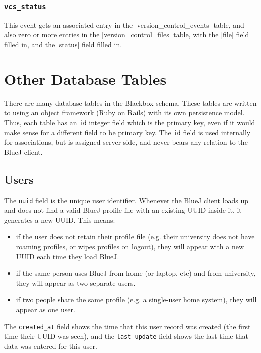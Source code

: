 \documentclass{book}
\begin{document}
\subsection{\lstinline|vcs_status|}

This event gets an associated entry in the |version_control_events|
table, and also zero or more entries in the |version_control_files|
table, with the |file| field filled in, and the |status| field filled
in.

\chapter{Other Database Tables}

There are many database tables in the Blackbox schema.  These tables are
written to using an object framework (Ruby on Rails) with its own persistence
model.  Thus, each table has an \verb$id$ integer field which is the primary
key, even if it would make sense for a different field to be primary key.  The
\texttt{id} field is used internally for associations, but is assigned
server-side, and never bears any relation to the BlueJ client.

\section{Users}


The \texttt{uuid} field is the unique user identifier.  Whenever the BlueJ
client loads up and does not find a valid BlueJ profile file with an existing
UUID inside it, it generates a new UUID.  This means:

\begin{itemize}
\item if the user does not retain their profile file (e.g. their university
  does not have roaming profiles, or wipes profiles on logout), they will
  appear with a new UUID each time they load BlueJ.
\item if the same person uses BlueJ from home (or laptop, etc) and from
  university, they will appear as two separate users.
\item if two people share the same profile (e.g. a single-user home system),
  they will appear as one user.
\end{itemize}

The \texttt{created\_at} field shows the time that this user record was
created (the first time their UUID was seen), and the \texttt{last\_update} field shows the last time that data was entered for
this user.
\end{document}
